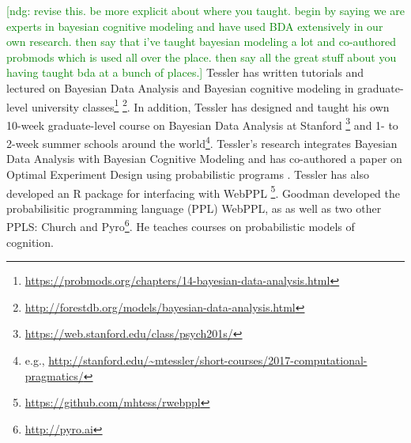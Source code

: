 \documentclass[10pt,letterpaper]{article}
\newcommand{\ndg}[1]{\textcolor{green}{[ndg: #1]}}
\begin{document}
\ndg{revise this. be more explicit about where you taught. begin by saying we are experts in bayesian cognitive modeling and have used BDA extensively in our own research. then say that i've taught bayesian modeling a lot and co-authored probmods which is used all over the place. then say all the great stuff about you having taught bda at a bunch of places.}
Tessler has written tutorials and lectured on Bayesian Data Analysis and Bayesian cognitive modeling in graduate-level university classes\footnote{\url{https://probmods.org/chapters/14-bayesian-data-analysis.html}}
\footnote{\url{http://forestdb.org/models/bayesian-data-analysis.html}}.
In addition, Tessler has designed and taught his own 10-week graduate-level course on Bayesian Data Analysis at Stanford \footnote{
\url{https://web.stanford.edu/class/psych201s/}
} and 1- to 2-week summer schools around the world\footnote{
e.g., \url{http://stanford.edu/~mtessler/short-courses/2017-computational-pragmatics/}}.
Tessler's research integrates Bayesian Data Analysis with Bayesian Cognitive Modeling and has co-authored a paper on Optimal Experiment Design using probabilistic programs \cite{OuyangTLG16}.  
Tessler has also developed an R package for interfacing with WebPPL \footnote{\url{https://github.com/mhtess/rwebppl}}.
Goodman developed the probabilisitic programming language (PPL) WebPPL, as as well as two other PPLS: Church \cite{church} and Pyro\footnote{\url{http://pyro.ai}}.
He teaches courses on probabilistic models of cognition.




\setlength{\bibleftmargin}{.125in}
\setlength{\bibindent}{-\bibleftmargin}


\end{document}
